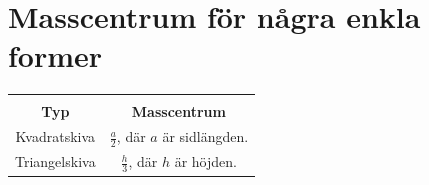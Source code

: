 \documentclass{article}
\newenvironment{ankiflashcard}[1]{}{}
\begin{document}
\newpage
\appendix

\begin{ankiflashcard}{Ange masscentrum för en kvadrat och triangel.}
    
\section{Masscentrum för några enkla former}
\large{
\begin{tabular}{|c|c|}
    \hline \\
     \textbf{Typ} &  \textbf{Masscentrum} \\
     \hline
     Kvadratskiva & $\frac a 2$, där $a$ är sidlängden. \\
     \hline
    Triangelskiva & $\frac h 3$, där $h$ är höjden. \\
    \hline
    
\end{tabular}
}
\end{ankiflashcard}
\end{document}

